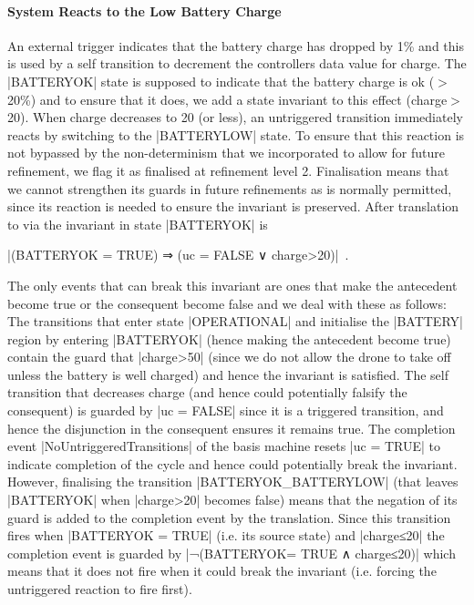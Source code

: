 \paragraph{System Reacts to the Low Battery Charge}%
%
An external trigger indicates that the battery charge has dropped by 1\% and this is used by a self transition to decrement the controllers data value for charge.
The |BATTERYOK| state is supposed to indicate that the battery charge is ok ($>$20\%) and to ensure that it does, we add a state invariant to this effect (charge$>$20).
When charge decreases to 20 (or less), an untriggered transition immediately reacts by switching to the |BATTERYLOW| state.
To ensure that this reaction is not bypassed by the non-determinism that we incorporated to allow for future refinement, we flag it as finalised at refinement level 2.
Finalisation means that we cannot strengthen its guards in future refinements as is normally permitted, since its reaction is needed to ensure the invariant is preserved.
After translation to 
\EVENTB via \UMLB
the invariant in state |BATTERYOK| is 
\begin{center}
 |(BATTERYOK = TRUE) ⇒ (uc = FALSE ∨ charge>20)|~.
\end{center}
The only events that can break this invariant are ones that make the antecedent become true or the consequent become false and we deal with these as follows:
The transitions that enter state |OPERATIONAL| and initialise the |BATTERY| region by entering |BATTERYOK| (hence making the antecedent become true) contain the guard that |charge>50| (since we do not allow the drone to take off unless the battery is well charged) and hence the invariant is satisfied.
The self transition that decreases charge (and hence could potentially falsify the consequent) is guarded by |uc = FALSE| since it is a triggered transition, and hence the disjunction in the consequent ensures it remains true.
The completion event |NoUntriggeredTransitions| of the basis machine resets |uc = TRUE| to indicate completion of the cycle and hence could potentially break the invariant. 
However, finalising the transition |BATTERYOK_BATTERYLOW| (that leaves |BATTERYOK| when |charge>20| becomes false) means that  the negation of its guard is added to the completion event by the translation.
Since this transition fires when |BATTERYOK = TRUE| (i.e. its source state) and |charge≤20| the completion event is guarded by |¬(BATTERYOK= TRUE ∧ charge≤20)| which means that it does not fire when it could break the invariant (i.e. forcing the untriggered reaction to fire first).

